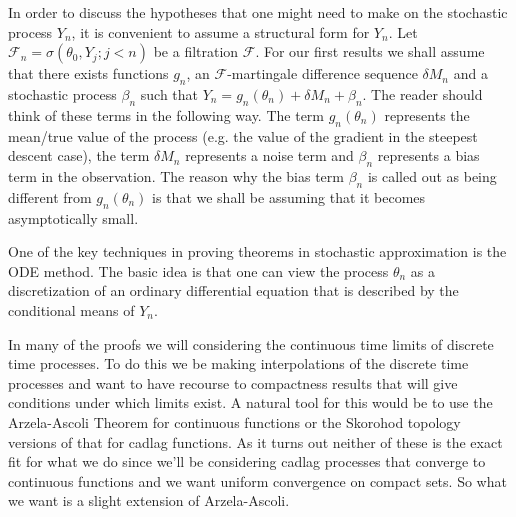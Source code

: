 In order to discuss the hypotheses that one might need to make on the stochastic process $Y_n$, it is convenient to assume a structural form for $Y_n$.  Let $\mathcal{F}_n = \sigma(\theta_0, Y_j ; j<n)$ be a filtration $\mathcal{F}$.  For our first results we shall assume that there exists functions $g_n$, an $\mathcal{F}$-martingale difference sequence $\delta M_n$ and a stochastic process $\beta_n$ such that $Y_n = g_n(\theta_n) + \delta M_n + \beta_n$.  The reader should think of these terms in the following way.  The term $g_n(\theta_n)$ represents the mean/true value of the process (e.g. the value of the gradient in the steepest descent case), the term $\delta M_n$ represents a noise term and $\beta_n$ represents a bias term in the observation.  The reason why the bias term $\beta_n$ is called out as being different from $g_n(\theta_n)$ is that we shall be assuming that it becomes asymptotically small.

One of the key techniques in proving theorems in stochastic approximation is the ODE method.  The basic idea is that one can view the process $\theta_n$ as a discretization of an ordinary differential equation 
that is described by the conditional means of $Y_n$.  

In many of the proofs we will considering the continuous time limits of discrete time processes.  To do this we be making interpolations of the discrete time processes and want to have recourse to compactness results that will give conditions under which limits exist.  A natural tool for this would be to use the Arzela-Ascoli Theorem for continuous functions or the Skorohod topology versions of that for cadlag functions.  As it turns out neither of these is the exact fit for what we do since we'll be considering cadlag processes that converge to continuous functions and we want uniform convergence on compact sets.  So what we want is a slight extension of Arzela-Ascoli.

